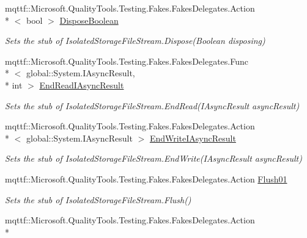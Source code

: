 \begin{DoxyCompactItemize}
mqttf\-::\-Microsoft.\-Quality\-Tools.\-Testing.\-Fakes.\-Fakes\-Delegates.\-Action\\*
$<$ bool $>$ \hyperlink{class_system_1_1_i_o_1_1_isolated_storage_1_1_fakes_1_1_stub_isolated_storage_file_stream_ae9b27c3d8b8d7dc73252a2841a09bb8d}{Dispose\-Boolean}
\begin{DoxyCompactList}\small\item\em Sets the stub of Isolated\-Storage\-File\-Stream.\-Dispose(\-Boolean disposing)\end{DoxyCompactList}\item 
mqttf\-::\-Microsoft.\-Quality\-Tools.\-Testing.\-Fakes.\-Fakes\-Delegates.\-Func\\*
$<$ global\-::\-System.\-I\-Async\-Result, \\*
int $>$ \hyperlink{class_system_1_1_i_o_1_1_isolated_storage_1_1_fakes_1_1_stub_isolated_storage_file_stream_ae0169cd0d3b2c747d389ac990e66fb7a}{End\-Read\-I\-Async\-Result}
\begin{DoxyCompactList}\small\item\em Sets the stub of Isolated\-Storage\-File\-Stream.\-End\-Read(\-I\-Async\-Result async\-Result)\end{DoxyCompactList}\item 
mqttf\-::\-Microsoft.\-Quality\-Tools.\-Testing.\-Fakes.\-Fakes\-Delegates.\-Action\\*
$<$ global\-::\-System.\-I\-Async\-Result $>$ \hyperlink{class_system_1_1_i_o_1_1_isolated_storage_1_1_fakes_1_1_stub_isolated_storage_file_stream_ae6834395e5ed5b284025fc7854b4eb73}{End\-Write\-I\-Async\-Result}
\begin{DoxyCompactList}\small\item\em Sets the stub of Isolated\-Storage\-File\-Stream.\-End\-Write(\-I\-Async\-Result async\-Result)\end{DoxyCompactList}\item 
mqttf\-::\-Microsoft.\-Quality\-Tools.\-Testing.\-Fakes.\-Fakes\-Delegates.\-Action \hyperlink{class_system_1_1_i_o_1_1_isolated_storage_1_1_fakes_1_1_stub_isolated_storage_file_stream_a366042316f6582952721814446f96505}{Flush01}
\begin{DoxyCompactList}\small\item\em Sets the stub of Isolated\-Storage\-File\-Stream.\-Flush()\end{DoxyCompactList}\item 
mqttf\-::\-Microsoft.\-Quality\-Tools.\-Testing.\-Fakes.\-Fakes\-Delegates.\-Action\\*

\end{DoxyCompactItemize}

